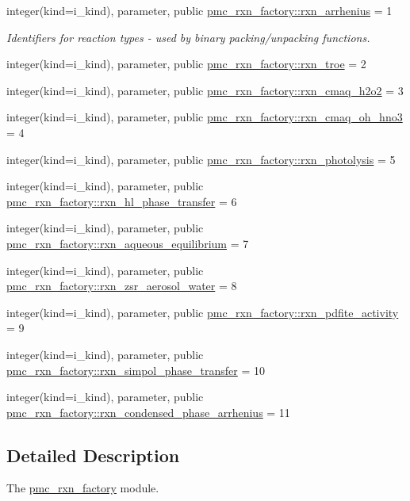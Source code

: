 \begin{DoxyCompactItemize}
\item 
integer(kind=i\+\_\+kind), parameter, public \mbox{\hyperlink{namespacepmc__rxn__factory_a8982f1039d9dbeb96d3417eb30e356a0}{pmc\+\_\+rxn\+\_\+factory\+::rxn\+\_\+arrhenius}} = 1
\begin{DoxyCompactList}\small\item\em Identifiers for reaction types -\/ used by binary packing/unpacking functions. \end{DoxyCompactList}\item 
integer(kind=i\+\_\+kind), parameter, public \mbox{\hyperlink{namespacepmc__rxn__factory_a5142ca027ce9f54cc7c4e49542e9bd0e}{pmc\+\_\+rxn\+\_\+factory\+::rxn\+\_\+troe}} = 2
\item 
integer(kind=i\+\_\+kind), parameter, public \mbox{\hyperlink{namespacepmc__rxn__factory_a776416a03ead756bd1cd206f93b763a6}{pmc\+\_\+rxn\+\_\+factory\+::rxn\+\_\+cmaq\+\_\+h2o2}} = 3
\item 
integer(kind=i\+\_\+kind), parameter, public \mbox{\hyperlink{namespacepmc__rxn__factory_aeb0e4677c84b942a0f1867a218a15404}{pmc\+\_\+rxn\+\_\+factory\+::rxn\+\_\+cmaq\+\_\+oh\+\_\+hno3}} = 4
\item 
integer(kind=i\+\_\+kind), parameter, public \mbox{\hyperlink{namespacepmc__rxn__factory_a0b06d4f20aae6434f216c79c418b256f}{pmc\+\_\+rxn\+\_\+factory\+::rxn\+\_\+photolysis}} = 5
\item 
integer(kind=i\+\_\+kind), parameter, public \mbox{\hyperlink{namespacepmc__rxn__factory_a8bf11f3e9a41f57cdb9232682785ff4d}{pmc\+\_\+rxn\+\_\+factory\+::rxn\+\_\+hl\+\_\+phase\+\_\+transfer}} = 6
\item 
integer(kind=i\+\_\+kind), parameter, public \mbox{\hyperlink{namespacepmc__rxn__factory_a55e52865bc0c395f5cd41bfd3ef382e0}{pmc\+\_\+rxn\+\_\+factory\+::rxn\+\_\+aqueous\+\_\+equilibrium}} = 7
\item 
integer(kind=i\+\_\+kind), parameter, public \mbox{\hyperlink{namespacepmc__rxn__factory_a67e274f604a27f1d65091919ee92e105}{pmc\+\_\+rxn\+\_\+factory\+::rxn\+\_\+zsr\+\_\+aerosol\+\_\+water}} = 8
\item 
integer(kind=i\+\_\+kind), parameter, public \mbox{\hyperlink{namespacepmc__rxn__factory_a3f039b0ac4cb1d88973935c55c763588}{pmc\+\_\+rxn\+\_\+factory\+::rxn\+\_\+pdfite\+\_\+activity}} = 9
\item 
integer(kind=i\+\_\+kind), parameter, public \mbox{\hyperlink{namespacepmc__rxn__factory_a1ba2b8ba97a5327f1dcdafd63538b7a6}{pmc\+\_\+rxn\+\_\+factory\+::rxn\+\_\+simpol\+\_\+phase\+\_\+transfer}} = 10
\item 
integer(kind=i\+\_\+kind), parameter, public \mbox{\hyperlink{namespacepmc__rxn__factory_ab0ee1f4ac771d7eaedf88c5e10118a5b}{pmc\+\_\+rxn\+\_\+factory\+::rxn\+\_\+condensed\+\_\+phase\+\_\+arrhenius}} = 11
\end{DoxyCompactItemize}


\subsection{Detailed Description}
The \mbox{\hyperlink{namespacepmc__rxn__factory}{pmc\+\_\+rxn\+\_\+factory}} module. 

